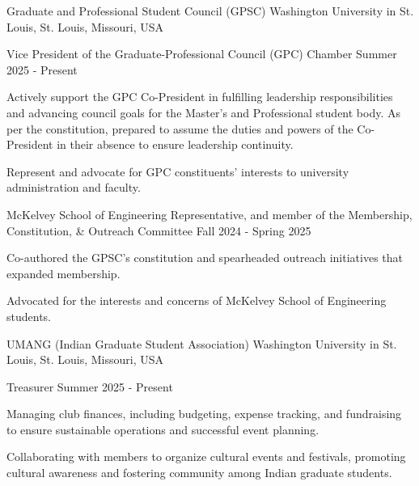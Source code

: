 \documentclass[10pt, letterpaper]{article}
\begin{document}
\begin{leadershipentry}
    {Graduate and Professional Student Council (GPSC)} %
    {Washington University in St. Louis, St. Louis, Missouri, USA} %
    \begin{positionentry}
        {Vice President of the Graduate-Professional Council (GPC) Chamber} %
        {Summer 2025 - Present} %
        \item Actively support the GPC Co-President in fulfilling leadership responsibilities and advancing council goals for the Master's and Professional student body. As per the constitution, prepared to assume the duties and powers of the Co-President in their absence to ensure leadership continuity.
        \item Represent and advocate for GPC constituents' interests to university administration and faculty.
    \end{positionentry}
    \begin{positionentry}
        {McKelvey School of Engineering Representative, and member of the Membership, Constitution, \& Outreach Committee} %
        {Fall 2024 - Spring 2025} %
        \item Co-authored the GPSC's constitution and spearheaded outreach initiatives that expanded membership.
        \item Advocated for the interests and concerns of McKelvey School of Engineering students.
    \end{positionentry}
\end{leadershipentry}

\begin{leadershipentry}
    {UMANG (Indian Graduate Student Association)} %
    {Washington University in St. Louis, St. Louis, Missouri, USA} %
    \begin{positionentry}
        {Treasurer} %
        {Summer 2025 - Present} %
        \item Managing club finances, including budgeting, expense tracking, and fundraising to ensure sustainable operations and successful event planning.
        \item Collaborating with members to organize cultural events and festivals, promoting cultural awareness and fostering community among Indian graduate students.
    \end{positionentry}
\end{leadershipentry}
\end{document}
